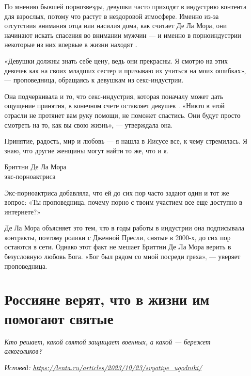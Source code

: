 По мнению бывшей порнозвезды, девушки часто приходят в индустрию контента для взрослых, потому что растут в нездоровой атмосфере. Именно из-за отсутствия внимания отца или насилия дома, как считает Де Ла Мора, они начинают искать спасения во внимании мужчин --- и именно в порноиндустрии некоторые из них впервые в жизни находят .

«Девушки должны знать себе цену, ведь они прекрасны. Я смотрю на этих девочек как на своих младших сестер и призываю их учиться на моих ошибках», ---  проповедница, обращаясь к девушкам из секс-индустрии.

Она подчеркивала и то, что секс-индустрия, которая поначалу может дать ощущение принятия, в конечном счете оставляет девушек . «Никто в этой отрасли не протянет вам руку помощи, не поможет спастись. Они будут просто смотреть на то, как вы  свою жизнь», --- утверждала она.

\begin{fancyquotes}
    Принятие, радость, мир и любовь --- я нашла в Иисусе все, к чему стремилась. Я знаю, что другие женщины могут найти то же, что и я.\\

    \begin{flushright}
        Бриттни Де Ла Мора\\
        экс-порноактриса
    \end{flushright}
\end{fancyquotes}

Экс-порноактриса добавляла, что ей до сих пор часто задают один и тот же вопрос: «Ты проповедница, почему порно с твоим участием все еще доступно в интернете?»

Де Ла Мора объясняет это тем, что в годы работы в индустрии она подписывала контракты, поэтому ролики с Дженной Пресли, снятые в 2000-х, до сих пор остаются в сети. Однако этот факт не мешает Бриттни Де Ла Мора верить в безусловную любовь Бога. «Бог был рядом со мной посреди греха», --- уверяет проповедница.

\newpage
\section{Россияне верят, что в жизни им помогают святые}

\textit{Кто решает, какой святой защищает военных, а какой — бережет алкоголиков?}

\textit{Исповед: \url{https://lenta.ru/articles/2023/10/23/svyatiye_ugodniki/}}

